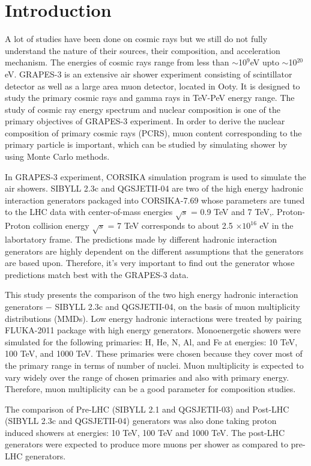\documentclass[12pt]{article}
\begin{document}
\section{Introduction}
A lot of studies have been done on cosmic rays but we still do not fully understand the nature of their sources, their composition, and acceleration mechanism. The energies of cosmic rays range from less than $\sim$10$^{9}$eV upto $\sim$10$^{20}$eV.  
GRAPES-3 is an extensive air shower experiment consisting of scintillator detector as well as a large area muon detector, located in Ooty. \cite{gupta} It is designed to study the primary cosmic rays and gamma rays in TeV-PeV energy range. The study of cosmic ray energy spectrum and nuclear composition is one of the primary objectives of GRAPES-3 experiment. In order to derive the nuclear composition of primary cosmic rays (PCRS), muon content corresponding to  the primary particle is important, which can be studied by simulating shower by using Monte Carlo methods. 

In GRAPES-3 experiment, CORSIKA simulation program is used to simulate the air showers. SIBYLL 2.3c and QGSJETII-04 are two of the high energy hadronic interaction generators packaged into CORSIKA-7.69 whose parameters are tuned to the LHC data with center-of-mass energies $\sqrt{s}$ = 0.9 TeV and 7 TeV,\cite{mthesis}. Proton-Proton collision energy $\sqrt{s}$ = 7 TeV corresponds to about 2.5 $\times 10^{16}$ eV in the labortatory frame. The predictions made by different hadronic interaction generators are highly dependent on the different assumptions that the generators are based upon. Therefore, it's very important to find out the generator whose predictions match best with the GRAPES-3 data. 

This study presents the comparison of the two high energy hadronic interaction generators $-$ SIBYLL 2.3c and QGSJETII-04,  on the basis of muon multiplicity distributions (MMDs). Low energy hadronic interactions were treated by pairing FLUKA-2011 package with high energy generators. Monoenergetic showers were simulated for the following primaries: H, He, N, Al, and Fe at energies: 10 TeV, 100 TeV, and 1000 TeV. These primaries were chosen because they cover most of the primary range in terms of number of nuclei. Muon multiplicity is expected to vary widely over the range of chosen primaries and also with primary energy. Therefore, muon multiplicity can be a good parameter for composition studies. 

The comparison of Pre-LHC (SIBYLL 2.1 and QGSJETII-03) and Post-LHC (SIBYLL 2.3c and QGSJETII-04) generators was also done taking proton induced showers at energies: 10 TeV, 100 TeV and 1000 TeV. The post-LHC generators were expected to produce more muons per shower as compared to pre-LHC generators.
\end{document}
